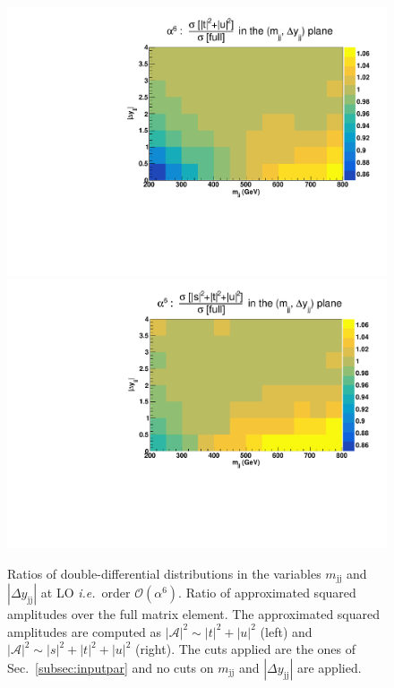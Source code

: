 \documentclass[twocolumn,epjc3]{svjour3} %
\newcommand{\Pj}{\ensuremath{\text{j}}\xspace}
\begin{document}
    \begin{figure}[hbt]
    \centering
    \includegraphics[scale=0.395]{figures/scanfigures/ratio_tu.pdf}
    \includegraphics[scale=0.395]{figures/scanfigures/ratio_stu.pdf}
    \caption{Ratios of double-differential distributions in the variables $m_{\Pj\Pj}$ and $|\Delta y_{\Pj\Pj}|$ at LO \emph{i.e.}\ order $\mathcal{O}(\alpha^6)$.
    Ratio of approximated squared amplitudes over the full matrix element.
    The approximated squared amplitudes are computed as $|\mathcal{A}|^2 \sim |t|^2 + |u|^2$ (left) and $|\mathcal{A}|^2 \sim |s|^2 + |t|^2 + |u|^2$ (right).
    The cuts applied are the ones of Sec.~\protect\ref{subsec:inputpar} and no cuts on $m_{\Pj\Pj}$ and $|\Delta y_{\Pj\Pj}|$ are applied.} 
    \label{fig:ratio2d_LO}
    \end{figure}
\end{document}
